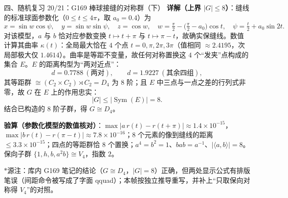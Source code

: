 \documentclass[aspectratio=169,10pt,fontset=none]{ctexbeamer}
\newcommand{\key}[1]{\textcolor{ink}{\bfseries #1}}
\newcommand{\starpt}{\textcolor{accent}{\bfseries$\ast$}}
\begin{document}
\begin{frame}[t]{四、随机复习 20/21：G169 棒球接缝的对称群（下）}
\scriptsize
\key{详解（上界 $|G|\le8$）}：缝线的标准球面参数化（$0\le t\le4\pi$，取 $a_0=0.4$）为
\[ x=\sin w\cos\psi,\quad y=\sin w\sin\psi,\quad z=\cos w,\quad w=\tfrac\pi2-\bigl(\tfrac\pi2-a_0\bigr)\cos t,\quad \psi=\tfrac t2+a_0\sin2t. \]
对该模型，$a$ 与 $b$ 恰对应参数变换 $t\mapsto t+\pi$ 与 $t\mapsto\pi-t$，故确实保缝线。数值计算其曲率 $\kappa(t)$：全局最大恰在 $4$ 个点 $t=0,\pi,2\pi,3\pi$（值相同 $\approx2.4195$，次局部极大仅 $1.4614$）。曲率是等距不变量，故任何对称置换这 $4$ 个“发夹”点构成的集合 $E$。$E$ 的距离构型为“两对近点”：
\[ d=0.7788\ (\text{两对}),\qquad d=1.9227\ (\text{其余四组}), \]
其等距群 $\cong (C_2\times C_2)\rtimes C_2=D_4$ 为 $8$ 阶；且 $E$ 中三点与一点之差的行列式非零，故 $G$ 在 $E$ 上的作用忠实：
\[ |G|\le|\operatorname{Sym}(E)|=8. \]
结合已构造的 $8$ 阶子群，得 $G\cong D_4$。

\key{验算（参数化模型的数值核对）}：$\max|a\,r(t)-r(t+\pi)|\approx1.4\times10^{-15}$，$\max|b\,r(t)-r(\pi-t)|\approx7.8\times10^{-16}$；$8$ 个元素的像到缝线的距离 $\le3.3\times10^{-15}$；四点的等距群恰 $8$ 个置换；$a^4=b^2=1$、$bab=a^{-1}$、$|\langle a,b\rangle|=8$。保向子群 $\{1,h,b,a^2b\}\cong V_4$，指数 $2$。

\starpt 源注：库内 G169 笔记的结论（$G\cong D_4$，$|G|=8$）正确，但两处显示公式有排版笔误（间距命令被写成了字面 qquad）；本帧按独立推导重写，并补上“只取保向对称得 $V_4$”的对照。
\end{frame}
\end{document}

